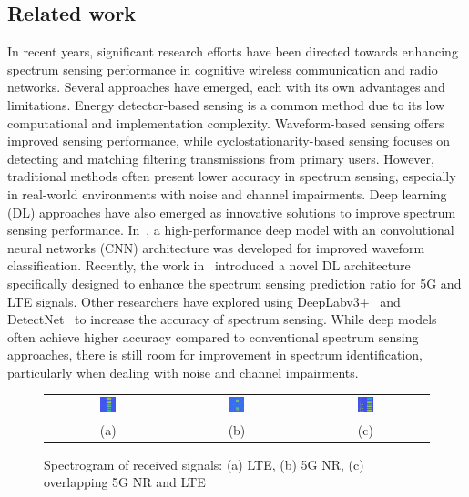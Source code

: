 \documentclass[journal]{IEEEtran} %
\begin{document}
\subsection{Related work}

In recent years, significant research efforts have been directed towards enhancing spectrum sensing performance in cognitive wireless communication and radio networks. Several approaches have emerged, each with its own advantages and limitations. Energy detector-based sensing is a common method due to its low computational and implementation complexity. Waveform-based sensing offers improved sensing performance, while cyclostationarity-based sensing focuses on detecting and matching filtering transmissions from primary users.
However, traditional methods often present lower accuracy in spectrum sensing, especially in real-world environments with noise and channel impairments.
Deep learning (DL) approaches have also emerged as innovative solutions to improve spectrum sensing performance. In~\cite{huynh2024improved}, a  high-performance deep model with an convolutional neural networks (CNN) architecture was developed for improved waveform classification. Recently, the work in~\cite{huynhthe2023intelligence} introduced a novel DL architecture specifically designed to enhance the spectrum sensing prediction ratio for 5G and LTE signals. Other researchers have explored using DeepLabv3+~\cite{nguyen2023accurate} and DetectNet~\cite{gao2019deep} to increase the accuracy of spectrum sensing.
While deep models often achieve higher accuracy compared to conventional spectrum sensing approaches, there is still room for improvement in spectrum identification, particularly when dealing with noise and channel impairments.

\begin{figure}[!t]
    \centering
    \footnotesize
    \begin{tabular}{ccc}
        \includegraphics[width=0.13\textwidth]{img/LTE_frame_0.png}  & \includegraphics[width=0.13\textwidth]{img/NR_frame_1506.png} &
        \includegraphics[width=0.13\textwidth]
        {img/LTE_NR_frame_0.png} 
        \\
        (a) & (b) & (c)
    \end{tabular}
    \caption{Spectrogram of received signals: (a) LTE, (b) 5G NR, (c) overlapping 5G NR and LTE}
    \label{fig2}
\end{figure}
\end{document}

